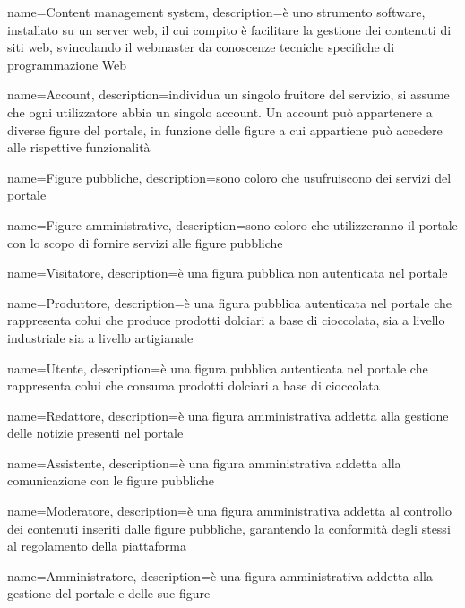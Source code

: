 
{
    name={Content management system},
    description={è uno strumento software, installato su un server web, il cui
        compito è facilitare la gestione dei contenuti di siti web, svincolando il
        webmaster da conoscenze tecniche specifiche di programmazione Web}
}


{
    name={Account},
    description={individua un singolo fruitore del servizio, si assume che ogni utilizzatore abbia un singolo account. Un account può appartenere a diverse figure del portale, in funzione delle figure a cui appartiene può accedere alle rispettive funzionalità}
}

{
    name={Figure pubbliche},
    description={sono coloro che usufruiscono dei servizi del portale}
}

{
    name={Figure amministrative},
    description={sono coloro che utilizzeranno il portale con lo scopo di fornire servizi alle figure pubbliche}
}

{
    name={Visitatore},
    description={è una figura pubblica non autenticata nel portale}
}

{
    name={Produttore},
    description={è una figura pubblica autenticata nel portale che rappresenta colui che produce prodotti dolciari a base di cioccolata, sia a livello industriale sia a livello artigianale}
}

{
    name={Utente},
    description={è una figura pubblica autenticata nel portale che rappresenta colui che consuma prodotti dolciari a base di cioccolata}
}

{
    name={Redattore},
    description={è una figura amministrativa addetta alla gestione delle notizie presenti nel portale}
}

{
    name={Assistente},
    description={è una figura amministrativa addetta alla comunicazione con le figure pubbliche}
}

{
    name={Moderatore},
    description={è una figura amministrativa addetta al controllo dei contenuti inseriti dalle figure pubbliche, garantendo la conformità degli stessi al regolamento della piattaforma}
}

{
    name={Amministratore},
    description={è una figura amministrativa addetta alla gestione del portale e delle sue figure}
}


